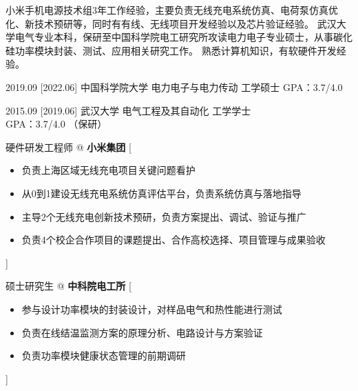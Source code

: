 \documentclass[zh]{resume}
\begin{document}
\makeheader

{\onehalfspacing\hspace{2em}%
小米手机电源技术组3年工作经验，主要负责无线充电系统仿真、电荷泵仿真优化、新技术预研等，同时有有线、无线项目开发经验以及芯片验证经验。
武汉大学电气专业本科，保研至中国科学院电工研究所攻读电力电子专业硕士，从事碳化硅功率模块封装、测试、应用相关研究工作。
熟悉计算机知识，有软硬件开发经验。
\par}

\begin{educations}
  \education%
    {2019.09}%
    [2022.06]%
    {中国科学院大学}%
    {电力电子与电力传动}%
    {工学硕士}%
    {GPA：3.7/4.0}
    
  \separator{0.1ex}
  \education%
    {2015.09}%
    [2019.06]%
    {武汉大学}%
    {电气工程及其自动化}%
    {工学学士}%
    {GPA：3.7/4.0 （保研）}
\end{educations}

\begin{experiences}
    {硬件研发工程师 @ \textbf{小米集团}}%
    [\begin{itemize}
      \item 负责上海区域无线充电项目关键问题看护
      \item 从0到1建设无线充电系统仿真评估平台，负责系统仿真与落地指导
      \item 主导2个无线充电创新技术预研，负责方案提出、调试、验证与推广
      \item 负责4个校企合作项目的课题提出、合作高校选择、项目管理与成果验收
    \end{itemize}]

  \separator{0.5ex}
    {硕士研究生 @ \textbf{中科院电工所}}%
    [\begin{itemize}
      \item 参与设计功率模块的封装设计，对样品电气和热性能进行测试
      \item 负责在线结温监测方案的原理分析、电路设计与方案验证
      \item 负责功率模块健康状态管理的前期调研
    \end{itemize}]
\end{experiences}
\end{document}

